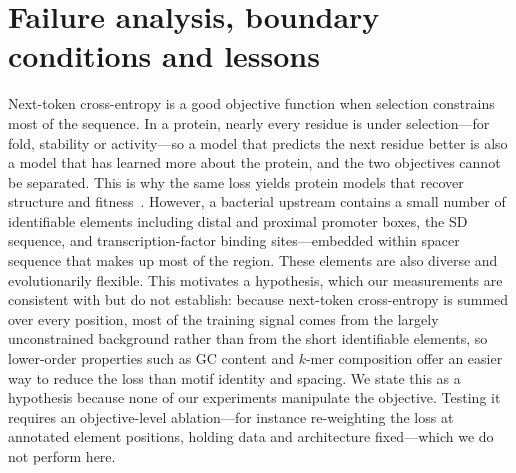 \documentclass{article}
\newcommand{\rev}[1]{\begingroup\color{red}#1\endgroup}
\begin{document}
\section{Failure analysis, boundary conditions and lessons}
\label{sec:why}

Next-token cross-entropy is a good objective function \rev{when selection
constrains most of the sequence.} In a protein, nearly every residue is under selection---for
fold, stability or activity---so a model that predicts the next residue better is
also a model that has learned more about the protein, and the two objectives
cannot be separated. This is why the same loss yields protein models that recover
structure and fitness~\citep{esm1v_meier2021,progen2_nijkamp2023,madani2023progen}. However, a bacterial upstream contains a small number of identifiable
elements including distal and proximal promoter boxes, the SD sequence, and transcription-factor
binding sites---embedded within spacer sequence that makes up most of the region. These
elements are also diverse and evolutionarily flexible. \rev{This motivates a hypothesis, which our measurements are
consistent with but do not establish: because next-token cross-entropy is summed
over every position, most of the training signal comes from the largely
unconstrained background rather than from the short identifiable elements, so
lower-order properties such as GC content and $k$-mer composition offer an easier
way to reduce the loss than motif identity and spacing. We state this as a
hypothesis because none of our experiments manipulate the objective. Testing it
requires an objective-level ablation---for instance re-weighting the loss at
annotated element positions, holding data and architecture fixed---which we do
not perform here.}
\end{document}

